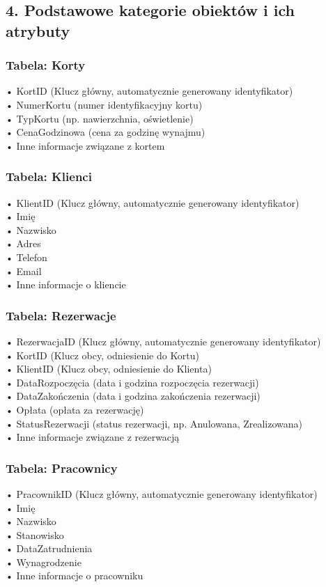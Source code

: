 \documentclass{article}
\begin{document}
\subsection*{4. Podstawowe kategorie obiektów i ich atrybuty}

\subsubsection*{Tabela: Korty}
•	KortID (Klucz główny, automatycznie generowany identyfikator)\\
•	NumerKortu (numer identyfikacyjny kortu)\\
•	TypKortu (np. nawierzchnia, oświetlenie)\\
•	CenaGodzinowa (cena za godzinę wynajmu)\\
•	Inne informacje związane z kortem\\

\subsubsection*{Tabela: Klienci}
•	KlientID (Klucz główny, automatycznie generowany identyfikator)\\
•	Imię\\
•	Nazwisko\\
•	Adres\\
•	Telefon\\
•	Email\\
•	Inne informacje o kliencie

\subsubsection*{Tabela: Rezerwacje}
•	RezerwacjaID (Klucz główny, automatycznie generowany identyfikator)\\
•	KortID (Klucz obcy, odniesienie do Kortu)\\
•	KlientID (Klucz obcy, odniesienie do Klienta)\\
•	DataRozpoczęcia (data i godzina rozpoczęcia rezerwacji)\\
•	DataZakończenia (data i godzina zakończenia rezerwacji)\\
•	Opłata (opłata za rezerwację)\\
•	StatusRezerwacji (status rezerwacji, np. Anulowana, Zrealizowana)\\
•	Inne informacje związane z rezerwacją\\

\subsubsection*{Tabela: Pracownicy}
•	PracownikID (Klucz główny, automatycznie generowany identyfikator)\\
•	Imię\\
•	Nazwisko\\
•	Stanowisko\\
•	DataZatrudnienia\\
•	Wynagrodzenie\\
•	Inne informacje o pracowniku
\end{document}
